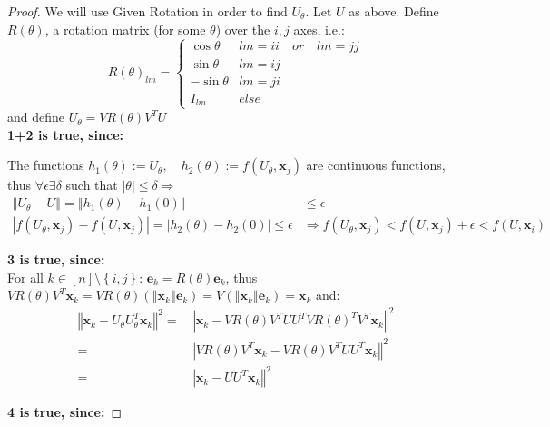 \documentclass{article}
\newcommand{\x}{{\mathbf x}}
\newcommand{\e}{{\mathbf e}}
\newcommand{\norm}[1]{\left\Vert #1\right\Vert}
\begin{document}
\begin{proof}
We will use Given Rotation in order to find $U_\theta$. Let $U$ as above. Define $R(\theta)$, a rotation matrix (for some $\theta$) over the $i,j$ axes, i.e.:
$$
R(\theta)_{lm}=\begin{cases}
\cos\theta & lm=ii\quad or\quad lm=jj\\
\sin\theta & lm=ij\\
-\sin\theta & lm=ji\\
I_{lm} & else
\end{cases}
$$
and define $U_{\theta}=VR(\theta)V^TU$\\

\textbf{1+2 is true, since:} 

The functions $h_1\left(\theta\right):=U_{\theta},\quad h_2(\theta):=f(U_{\theta}, \x_j)$ are continuous functions, thus $\forall\epsilon\exists\delta$ such that $|\theta| \le\delta\Rightarrow$ 
\begin{align*}
  \left\Vert U_{\theta}- U\right\Vert = \left\Vert h_1(\theta)-h_1(0)\right\Vert& \le\epsilon  \\
  \left|f(U_{\theta},\x_j)- f(U,\x_j)\right|=\left|h_2(\theta)-h_2(0)\right|\le\epsilon&\Rightarrow f(U_{\theta},\x_j)<f(U,\x_j) + \epsilon < f(U,\x_i)
\end{align*}


\textbf{3 is true, since:} \\
For all $k\in[n]\setminus\left\{ i,j\right\}$: $\e_k=R(\theta)\e_k$, thus $VR(\theta)V^T\x_k=VR(\theta)(\norm{\x_k}\e_k)=V(\norm{\x_k}\e_k)=\x_k$ and:
\begin{align*}
\left\Vert \x_{k}-U_{\theta}U_{\theta}^{T}\x_{k}\right\Vert^{2}
=&\left\Vert\x_{k}-VR(\theta)V^TUU^{T}VR(\theta)^{T}V^T\x_{k}\right\Vert^{2}\\
=&\left\Vert VR(\theta)V^T\x_{k}-VR(\theta)V^TUU^{T}\x_{k}\right\Vert^{2}\\
=&\left\Vert\x_{k}-UU^{T}\x_{k}\right\Vert^{2}
\end{align*}

\textbf{4 is true, since:} 


\end{proof}
\end{document}

